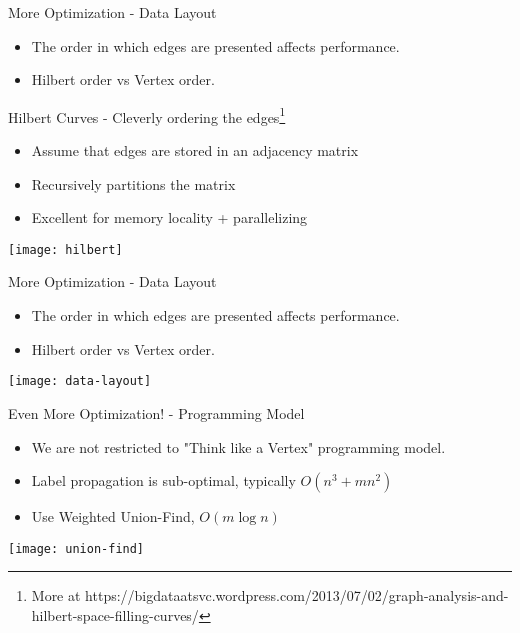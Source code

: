 \begin{frame}[t]{More Optimization - Data Layout}
  \begin{itemize}
    \item The order in which edges are presented affects performance.
    \item Hilbert order vs Vertex order.
  \end{itemize}

  \pause

  \vspace{0.25cm}

  Hilbert Curves - Cleverly ordering the edges\footnote{More at https://bigdataatsvc.wordpress.com/2013/07/02/graph-analysis-and-hilbert-space-filling-curves/}
  \begin{itemize}
    \item Assume that edges are stored in an adjacency matrix
    \item Recursively partitions the matrix
    \item Excellent for memory locality + parallelizing
  \end{itemize}

  \begin{center}
    \texttt{[image: hilbert]}
  \end{center}
\end{frame}

\begin{frame}[t]{More Optimization - Data Layout}
  \begin{itemize}
    \item The order in which edges are presented affects performance.
    \item Hilbert order vs Vertex order.
  \end{itemize}

  \vspace{0.5cm}
  \begin{center}
    \texttt{[image: data-layout]}
  \end{center}
\end{frame}

\begin{frame}[t]{Even More Optimization! - Programming Model}
  \begin{itemize}
    \item We are not restricted to "Think like a Vertex" programming model.
    \item Label propagation is sub-optimal, typically $O(n^3 + mn^2)$
    \item Use Weighted Union-Find, $O(m \log{n})$
  \end{itemize}

  \pause

  \vspace{0.5cm}
  \begin{center}
    \texttt{[image: union-find]}
  \end{center}
\end{frame}

